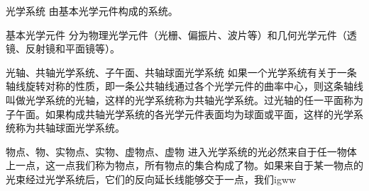 

\begin{definition}{光学系统}
由基本光学元件构成的系统。
\end{definition}

\begin{definition}{基本光学元件}
分为物理光学元件（光栅、偏振片、波片等）和几何光学元件（透镜、反射镜和平面镜等）。
\end{definition}

\begin{definition}{光轴、共轴光学系统、子午面、共轴球面光学系统}
如果一个光学系统有关于一条轴线旋转对称的性质，即一条公共轴线通过各个光学元件的曲率中心，则这条轴线叫做光学系统的光轴，这样的光学系统称为共轴光学系统。过光轴的任一平面称为子午面。如果构成共轴光学系统的各光学元件表面均为球面或平面，这样的光学系统称为共轴球面光学系统。
\end{definition}

\begin{definition}{物点、物、实物点、实物、虚物点、虚物}
进入光学系统的光必然来自于任一物体上一点，这一点我们称为物点，所有物点的集合构成了物。如果来自于某一物点的光束经过光学系统后，它们的反向延长线能够交于一点，我们igww
\end{definition}
